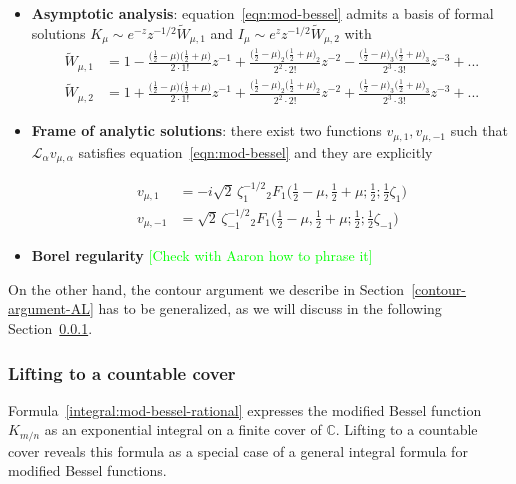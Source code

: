 \documentclass{article}
\newcommand{\C}{\mathbb{C}}
\begin{document}
\begin{itemize}
 \item \textbf{Asymptotic analysis}: equation~\eqref{eqn:mod-bessel} admits a basis of formal solutions $K_{\mu}\sim e^{-z} z^{-1/2} \tilde{W}_{\mu, 1}$ and $I_{\mu} \sim e^z z^{-1/2} \tilde{W}_{\mu, 2}$ with 
 \begin{align*}
 \tilde{W}_{\mu,1} &= 1- \frac{\big(\tfrac{1}{2}-\mu\big)\big(\frac{1}{2}+\mu\big)}{2 \cdot 1!} z^{-1} + \frac{\big(\tfrac{1}{2}-\mu\big)_2\big(\frac{1}{2}+\mu\big)_2}{2^2 \cdot 2!} z^{-2} - \frac{\big(\tfrac{1}{2}-\mu\big)_3\big(\frac{1}{2}+\mu\big)_3}{2^3 \cdot 3!} z^{-3}+...\\
 \tilde{W}_{\mu,2} &= 1+\frac{\big(\tfrac{1}{2}-\mu\big)\big(\frac{1}{2}+\mu\big)}{2 \cdot 1!} z^{-1} + \frac{\big(\tfrac{1}{2}-\mu\big)_2\big(\frac{1}{2}+\mu\big)_2}{2^2 \cdot 2!} z^{-2}+ \frac{\big(\tfrac{1}{2}-\mu\big)_3\big(\frac{1}{2}+\mu\big)_3}{2^3 \cdot 3!} z^{-3} + ...
\end{align*}   
 \item  \textbf{Frame of analytic solutions}: there exist two functions $v_{\mu, 1}, v_{\mu, -1}$ such that $\mathcal{L}_{\alpha}v_{\mu, \alpha}$ satisfies equation~\eqref{eqn:mod-bessel} and they are explicitly 

\begin{align*}
v_{\mu, 1}&=-i\sqrt{2}\,\zeta_{1}^{-1/2}  {}_2F_1\big(\tfrac{1}{2}-\mu, \tfrac{1}{2}+\mu; \tfrac{1}{2}; \tfrac{1}{2}\zeta_{1}\big)\\
v_{\mu, -1}&=\sqrt{2}\,\zeta_{-1}^{-1/2}  {}_2F_1\big(\tfrac{1}{2}-\mu, \tfrac{1}{2}+\mu; \tfrac{1}{2}; \tfrac{1}{2}\zeta_{-1}\big)
\end{align*}
\item \textbf{Borel regularity} \textcolor{Lime}{[Check with Aaron how to phrase it]} 
\end{itemize}

On the other hand, the contour argument we describe in Section~\ref{contour-argument-AL} has to be generalized, as we will discuss in the following Section~\ref{countable-cover}. 



\subsubsection{Lifting to a countable cover}\label{countable-cover}
Formula~\eqref{integral:mod-bessel-rational} expresses the modified Bessel function $K_{m/n}$ as an exponential integral on a finite cover of $\C$. Lifting to a countable cover reveals this formula as a special case of a general integral formula for modified Bessel functions.
\end{document}
